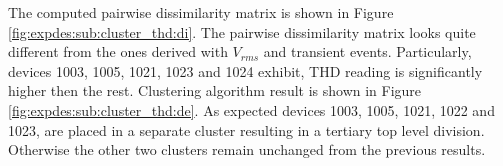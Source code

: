 The computed pairwise dissimilarity matrix is shown in Figure \ref{fig:expdes:sub:cluster_thd:di}.
The pairwise dissimilarity matrix looks quite different from the ones derived with $V_{rms}$ and transient events.
Particularly, devices 1003, 1005, 1021, 1023 and 1024 exhibit, THD reading is significantly higher then the rest.
Clustering algorithm result is shown in Figure \ref{fig:expdes:sub:cluster_thd:de}.
As expected devices 1003, 1005, 1021, 1022 and 1023, are placed in a separate cluster resulting in a tertiary top level division.
Otherwise the other two clusters remain unchanged from the previous results.
%


